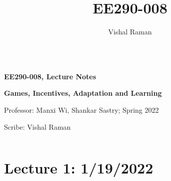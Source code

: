 \documentclass[11pt]{scrartcl}
\newcommand{\1}{\textbf{1}} %
\begin{document}
\title{EE290-008}
\author{Vishal Raman}
\thispagestyle{empty}
$ $
\vfill
\begin{center}

\centerline{\huge \textbf{EE290-008, Lecture Notes}}
\centerline{\Large \textbf{Games, Incentives, Adaptation and Learning} }
\centerline{Professor: Manxi Wi, Shankar Sastry; Spring 2022}
\centerline{Scribe: Vishal Raman}
\end{center}
\vfill
$ $
\newpage
\thispagestyle{empty}
\tableofcontents
\newpage

\section{Lecture 1: 1/19/2022}
\end{document}
